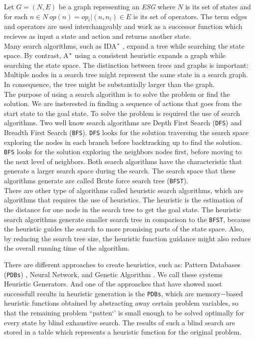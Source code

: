 Let $G = (N,E)$ be a graph representing an \textit{ESG} where $N$ is its set of states and for each $n \in N\  op(n) = {op_{i}|(n, n_i) \in E}$ is its set of operators. The term edges and operators are used interchangeably and work as a successor function which recieves as input a state and action and returns another state.\\

Many search algorithms, such as IDA$\sp{*}$ \cite{Korf85ida}, expand a tree while searching the state space. By contrast, A$\sp{*}$ using a consistent heuristic expands a graph while searching the state space. The distinction between trees and graphs is important: Multiple nodes in a search tree might represent the same state in a search graph. In consequence, the tree might be substantially larger than the graph.\\

The purpose of using a search algorithm is to solve the problem or find the solution. We are insterested in finding a sequence of actions that goes from the start state to the goal state. To solve the problem is required the use of search algorithms. Two well know search algorithms are Depth First Search (\texttt{DFS}) and Breadth First Search (\texttt{BFS}). \texttt{DFS} looks for the solution traversing the search space exploring the nodes in each branch before backtracking up to find the solution. \texttt{BFS} looks for the solution exploring the neighbors nodes first, before moving to the next level of neighbors. Both search algorithms have the characteristic that generate a larger search space during the search. The search space that these algorithms generate are called Brute force search tree (\texttt{BFST}).\\

There are other type of algorithms called heuristic search algorithms, which are algorithms that requires the use of heuristics. The heuristic is the estimation of the distance for one node in the search tree to get the goal state. The heuristic search algorithms generate smaller search tree in comparison to the \texttt{BFST}, because the heuristic guides the search to more promising parts of the state space. Also, by reducing the search tree size, the heuristic function guidance might also reduce the overall running time of the algorithm.

There are different approaches to create heuristics, such as: Pattern Databases (\texttt{PDBs}) \cite{haslum2007domain}, Neural Network, and Genetic Algorithm \cite{edelkamp2007automated}. We call these systems Heuristic Generators. And one of the approaches that have showed most successfull results in heuristic generation is the \texttt{PDBs}, which are memory$-$based heuristic functions obtained by abstracting away certain problem variables, so that the remaining problem ``patten‘’ is small enough to be solved optimally for every state by blind exhaustive search. The results of such a blind search are stored in a table which represents a heuristic function for the original problem.




